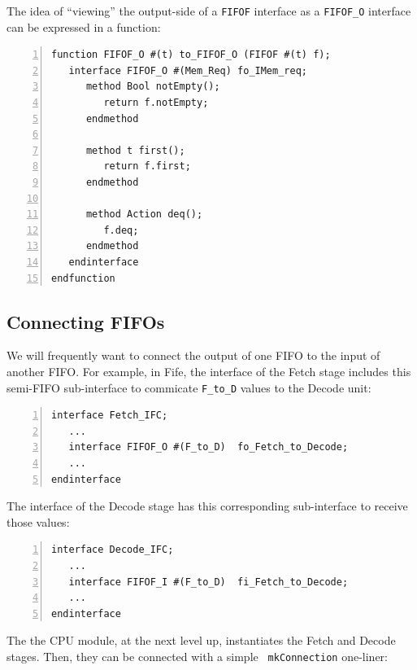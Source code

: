 The idea of ``viewing'' the output-side of a \verb|FIFOF| interface as
a \verb|FIFOF_O| interface can be expressed in a {\BSV} function:

{\footnotesize
\begin{Verbatim}[frame=single, numbers=left]
function FIFOF_O #(t) to_FIFOF_O (FIFOF #(t) f);
   interface FIFOF_O #(Mem_Req) fo_IMem_req;
      method Bool notEmpty();
         return f.notEmpty;
      endmethod

      method t first();
         return f.first;
      endmethod

      method Action deq();
         f.deq;
      endmethod
   endinterface
endfunction
\end{Verbatim}
}




\subsection{Connecting FIFOs}

\label{Sec_connecting_FIFOs}


We will frequently want to connect the output of one FIFO to the input
of another FIFO.  For example, in Fife, the interface of the Fetch
stage includes this semi-FIFO sub-interface to commicate \verb|F_to_D|
values to the Decode unit:

{\footnotesize
\begin{Verbatim}[frame=single, numbers=left]
interface Fetch_IFC;
   ...
   interface FIFOF_O #(F_to_D)  fo_Fetch_to_Decode;
   ...
endinterface
\end{Verbatim}
}

The interface of the Decode stage has this corresponding sub-interface
to receive those values:

{\footnotesize
\begin{Verbatim}[frame=single, numbers=left]
interface Decode_IFC;
   ...
   interface FIFOF_I #(F_to_D)  fi_Fetch_to_Decode;
   ...
endinterface
\end{Verbatim}
}

The the CPU module, at the next level up, instantiates the Fetch and
Decode stages.  Then, they can be connected with a simple {\tt
mkConnection} one-liner:

